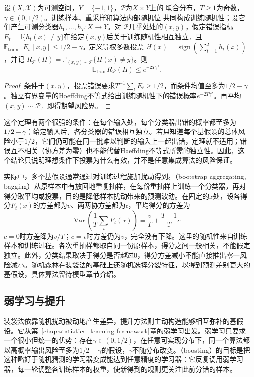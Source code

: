 \begin{theorem}[独立错误下的多数投票]
\label{thm:independent-majority-vote}
设$(X,\mathcal X)$为可测空间，$Y=\{-1,1\}$，$\mathcal P$为$X\times Y$上的
联合分布，$T\geq1$为奇数，$\gamma\in(0,1/2)$。训练样本、重采样和算法内部随机位
共同构成训练随机性；设它们产生可测分类器$h_1,\ldots,h_T:X\to Y$。对
$\mathcal P$几乎处处的$(x,y)$，假定错误指标
$E_t=\mathbb I\{h_t(x)\neq y\}$在给定$(x,y)$后关于训练随机性相互独立，且
$\mathbb E_{\mathrm{train}}[E_t\mid x,y]\leq1/2-\gamma$。定义等权多数投票
$H(x)=\operatorname{sign}(\sum_{t=1}^T h_t(x))$，并记
$R_{\mathcal P}(H)=\mathbb P_{(x,y)\sim\mathcal P}\{H(x)\neq y\}$。则
\[
 \mathbb E_{\mathrm{train}}R_{\mathcal P}(H)\leq e^{-2T\gamma^2}.
\]
\end{theorem}

\begin{proof}
条件于$(x,y)$，投票错误要求$T^{-1}\sum_tE_t\geq1/2$，而条件均值至多为$1/2-\gamma$。独立有界变量的Hoeffding不等式给出训练随机性下的错误概率$e^{-2T\gamma^2}$。再平均$(x,y)\sim\mathcal P$，即得期望风险界。
\end{proof}

这个定理有两个很强的条件：在每个输入处，每个分类器出错的概率都至多为$1/2-\gamma$；给定输入后，各分类器的错误相互独立。若只知道每个基假设的总体风险小于$1/2$，它们仍可能在同一批难以判断的输入上一起出错，定理就不适用；错误互不相关（协方差为零）也不能代替Hoeffding不等式所需的独立性。因此，这个结论只说明理想条件下投票为什么有效，并不是任意集成算法的风险保证。

实际中，多个基假设通常通过对训练过程施加扰动得到。（bootstrap aggregating, bagging）从原样本中有放回地重复抽样，在每份重抽样上训练一个分类器，再对得分取平均或投票，目的是降低样本扰动带来的预测波动。在固定的$x$处，设各得分$F_t(x)$的方差都为$v$、两两协方差都为$c$，平均得分的方差为
\[
 \operatorname{Var}\!\left(\frac1T\sum_tF_t(x)\right)
 =\frac{v}{T}+\frac{T-1}{T}c.
\]
$c=0$时方差降为$v/T$；$c=v$时方差仍为$v$，完全没有下降。这里的随机性来自训练样本和训练过程。各次重抽样都取自同一份原样本，得分之间一般相关，不能假定独立。此外，分类结果取决于得分是否越过0，得分方差减小不能直接推出零一风险减小。随机森林在装袋法的基础上还随机选择分裂特征，以得到预测差别更大的基假设，具体算法留待模型章节介绍。

\subsection{弱学习与提升}

装袋法依靠随机扰动被动地产生差异，提升方法则主动构造能够相互弥补的基假设。它从第~\ref{chap:statistical-learning-framework}章的弱学习出发。弱学习只要求一个很小但统一的优势：存在$\gamma\in(0,1/2)$，在任意可实现分布下，同一个算法都以高概率输出风险至多为$1/2-\gamma$的假设，$\gamma$不随分布改变。（boosting）的目标是把这种略好于随机猜测的学习器变成能达到任意精度的学习器：它反复调用弱学习器，每一轮调整各训练样本的权重，使新得到的规则更关注此前分错的样本。

